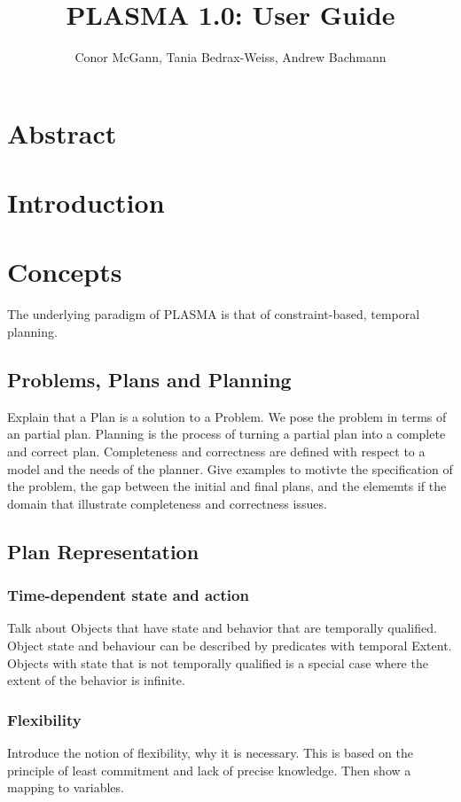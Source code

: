 \documentclass[10pt, letterpaper, twoside]{article}
\author{Conor McGann, Tania Bedrax-Weiss, Andrew Bachmann}
\title{PLASMA 1.0: User Guide}
\begin{document}
\maketitle

\section{Abstract}

\section{Introduction}

\section{Concepts}
The underlying paradigm of PLASMA is that of constraint-based, temporal planning.
\subsection{Problems, Plans and Planning}
Explain that a Plan is a solution to a Problem. We pose the problem in terms of an partial plan. Planning is the process of turning a partial plan into a complete and correct plan. Completeness and correctness are defined with respect to a model and the needs of the planner. Give examples to motivte the specification of the problem, the gap between the initial and final plans, and the elememts if the domain that illustrate completeness and correctness issues.
\subsection{Plan Representation}
\subsubsection{Time-dependent state and action}
Talk about Objects that have state and behavior that are temporally qualified. Object state and behaviour can be described by predicates with temporal Extent. Objects with state that is not temporally qualified is a special case where the extent of the behavior is infinite.
\subsubsection{Flexibility}
Introduce the notion of flexibility, why it is necessary. This is based on the principle of least commitment and lack of precise knowledge. Then show a mapping to variables.
\end{document}
